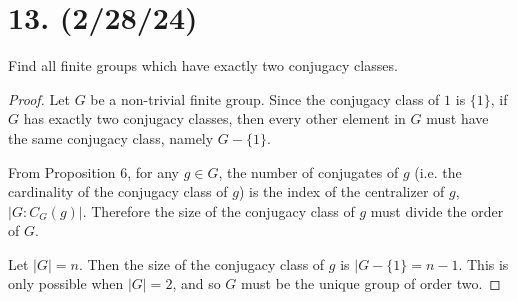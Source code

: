 \documentclass{article}
\begin{document}



\section*{13. (2/28/24)}

Find all finite groups which have exactly two conjugacy classes.

\begin{proof}
    Let $G$ be a non-trivial finite group. Since the conjugacy class of $1$ is $\{ 1 \}$, if $G$ has exactly two conjugacy classes, then every other element in $G$ must have the same conjugacy class, namely $G - \{ 1 \}$.

    From Proposition 6, for any $g \in G$, the number of conjugates of $g$ (i.e. the cardinality of the conjugacy class of $g$) is the index of the centralizer of $g$, $|G:C_G(g)|$. Therefore the size of the conjugacy class of $g$ must divide the order of $G$.

    Let $|G| = n$. Then the size of the conjugacy class of $g$ is $|G - \{ 1 \} = n - 1$. This is only possible when $|G| = 2$, and so $G$ must be the unique group of order two.
\end{proof}
\end{document}
